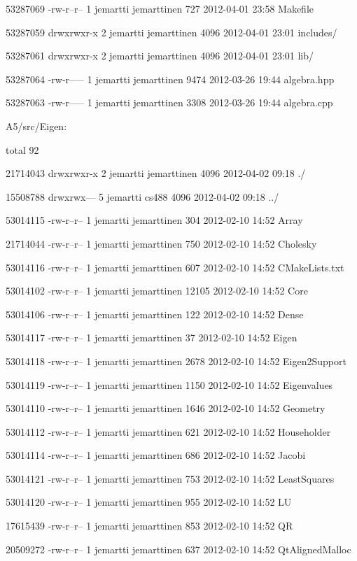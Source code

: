 \documentclass[11pt]{article}
\begin{document}
\begin{flushleft}
{53287069 -rw-r--r-- 1 jemartti jemarttinen   727 2012-04-01 23:58 Makefile

53287059 drwxrwxr-x 2 jemartti jemarttinen  4096 2012-04-01 23:01 includes/

53287061 drwxrwxr-x 2 jemartti jemarttinen  4096 2012-04-01 23:01 lib/

53287064 -rw-r----- 1 jemartti jemarttinen  9474 2012-03-26 19:44 algebra.hpp

53287063 -rw-r----- 1 jemartti jemarttinen  3308 2012-03-26 19:44 algebra.cpp

A5/src/Eigen:

total 92

21714043 drwxrwxr-x 2 jemartti jemarttinen  4096 2012-04-02 09:18 ./

15508788 drwxrwx--- 5 jemartti cs488        4096 2012-04-02 09:18 ../

53014115 -rw-r--r-- 1 jemartti jemarttinen   304 2012-02-10 14:52 Array

21714044 -rw-r--r-- 1 jemartti jemarttinen   750 2012-02-10 14:52 Cholesky

53014116 -rw-r--r-- 1 jemartti jemarttinen   607 2012-02-10 14:52 CMakeLists.txt

53014102 -rw-r--r-- 1 jemartti jemarttinen 12105 2012-02-10 14:52 Core

53014106 -rw-r--r-- 1 jemartti jemarttinen   122 2012-02-10 14:52 Dense

53014117 -rw-r--r-- 1 jemartti jemarttinen    37 2012-02-10 14:52 Eigen

53014118 -rw-r--r-- 1 jemartti jemarttinen  2678 2012-02-10 14:52 Eigen2Support

53014119 -rw-r--r-- 1 jemartti jemarttinen  1150 2012-02-10 14:52 Eigenvalues

53014110 -rw-r--r-- 1 jemartti jemarttinen  1646 2012-02-10 14:52 Geometry

53014112 -rw-r--r-- 1 jemartti jemarttinen   621 2012-02-10 14:52 Householder

53014114 -rw-r--r-- 1 jemartti jemarttinen   686 2012-02-10 14:52 Jacobi

53014121 -rw-r--r-- 1 jemartti jemarttinen   753 2012-02-10 14:52 LeastSquares

53014120 -rw-r--r-- 1 jemartti jemarttinen   955 2012-02-10 14:52 LU

17615439 -rw-r--r-- 1 jemartti jemarttinen   853 2012-02-10 14:52 QR

20509272 -rw-r--r-- 1 jemartti jemarttinen   637 2012-02-10 14:52 QtAlignedMalloc

}
\end{flushleft}
\end{document}
